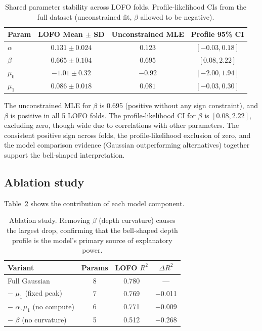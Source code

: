 \documentclass{article}
\begin{document}
\begin{table}[t]
\centering
\caption{Shared parameter stability across LOFO folds. Profile-likelihood CIs from the full dataset (unconstrained fit, $\beta$ allowed to be negative).}
\label{tab:params}
\begin{tabular}{lccc}
\toprule
Param & LOFO Mean $\pm$ SD & Unconstrained MLE & Profile 95\% CI \\
\midrule
$\alpha$ & $0.131 \pm 0.024$ & $0.123$ & $[-0.03, 0.18]$ \\
$\beta$ & $0.665 \pm 0.104$ & $0.695$ & $[0.08, 2.22]$ \\
$\mu_0$ & $-1.01 \pm 0.32$ & $-0.92$ & $[-2.00, 1.94]$ \\
$\mu_1$ & $0.086 \pm 0.018$ & $0.081$ & $[-0.03, 0.30]$ \\
\bottomrule
\end{tabular}
\end{table}

The unconstrained MLE for $\beta$ is 0.695 (positive without any sign constraint), and $\beta$ is positive in all 5 LOFO folds. The profile-likelihood CI for $\beta$ is $[0.08, 2.22]$, excluding zero, though wide due to correlations with other parameters. The consistent positive sign across folds, the profile-likelihood exclusion of zero, and the model comparison evidence (Gaussian outperforming alternatives) together support the bell-shaped interpretation.

\subsection{Ablation study}

Table~\ref{tab:ablation} shows the contribution of each model component.

\begin{table}[t]
\centering
\caption{Ablation study. Removing $\beta$ (depth curvature) causes the largest drop, confirming that the bell-shaped depth profile is the model's primary source of explanatory power.}
\label{tab:ablation}
\begin{tabular}{lccc}
\toprule
Variant & Params & LOFO $R^2$ & $\Delta R^2$ \\
\midrule
Full Gaussian & 8 & 0.780 & --- \\
$-$ $\mu_1$ (fixed peak) & 7 & 0.769 & $-$0.011 \\
$-$ $\alpha, \mu_1$ (no compute) & 6 & 0.771 & $-$0.009 \\
$-$ $\beta$ (no curvature) & 5 & 0.512 & $-$0.268 \\
\bottomrule
\end{tabular}
\end{table}
\end{document}
